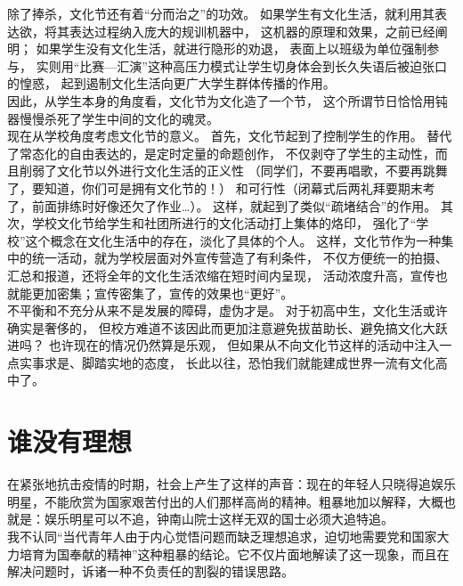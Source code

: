 \documentclass{article}
\begin{document}
    除了捧杀，文化节还有着“分而治之”的功效。
    如果学生有文化生活，就利用其表达欲，将其表达过程纳入庞大的规训机器中，
    这机器的原理和效果，之前已经阐明；
    如果学生没有文化生活，就进行隐形的劝退，
    表面上以班级为单位强制参与，
    实则用“比赛—汇演”这种高压力模式让学生切身体会到长久失语后被迫张口的惶惑，
    起到遏制文化生活向更广大学生群体传播的作用。\\

    因此，从学生本身的角度看，文化节为文化造了一个节，
    这个所谓节日恰恰用钝器慢慢杀死了学生中间的文化的魂灵。\\

    现在从学校角度考虑文化节的意义。
    首先，文化节起到了控制学生的作用。
    替代了常态化的自由表达的，是定时定量的命题创作，
    不仅剥夺了学生的主动性，而且削弱了文化节以外进行文化生活的正义性
    （同学们，不要再唱歌，不要再跳舞了，要知道，你们可是拥有文化节的！）
    和可行性（闭幕式后两礼拜要期末考了，前面排练时好像还欠了作业…）。
    这样，就起到了类似“疏堵结合”的作用。
    其次，学校文化节给学生和社团所进行的文化活动打上集体的烙印，
    强化了“学校”这个概念在文化生活中的存在，淡化了具体的个人。
    这样，文化节作为一种集中的统一活动，就为学校层面对外宣传营造了有利条件，
    不仅方便统一的拍摄、汇总和报道，还将全年的文化生活浓缩在短时间内呈现，
    活动浓度升高，宣传也就能更加密集；宣传密集了，宣传的效果也“更好”。\\

    不平衡和不充分从来不是发展的障碍，虚伪才是。
    对于初高中生，文化生活或许确实是奢侈的，
    但校方难道不该因此而更加注意避免拔苗助长、避免搞文化大跃进吗？
    也许现在的情况仍然算是乐观，
    但如果从不向文化节这样的活动中注入一点实事求是、脚踏实地的态度，
    长此以往，恐怕我们就能建成世界一流有文化高中了。\\

    \newpage
    
\section{谁没有理想}

在紧张地抗击疫情的时期，社会上产生了这样的声音：现在的年轻人只晓得追娱乐明星，不能欣赏为国家艰苦付出的人们那样高尚的精神。粗暴地加以解释，大概也就是：娱乐明星可以不追，钟南山院士这样无双的国士必须大追特追。\\

我不认同“当代青年人由于内心觉悟问题而缺乏理想追求，迫切地需要党和国家大力培育为国奉献的精神”这种粗暴的结论。它不仅片面地解读了这一现象，而且在解决问题时，诉诸一种不负责任的割裂的错误思路。\\
\end{document}
